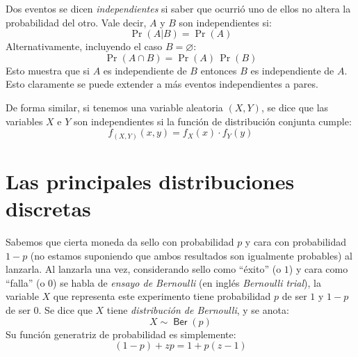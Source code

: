   Dos eventos se dicen \emph{independientes}%
  si saber que ocurrió uno de ellos
  no altera la probabilidad del otro.
  Vale decir,
  \(A\) y \(B\) son independientes si:
  \begin{equation*}
    \Pr(A \vert B)
      = \Pr(A)
  \end{equation*}
  Alternativamente,
  incluyendo el caso \(B = \varnothing\):
  \begin{equation}
    \label{eq:def-independencia}
    \Pr(A \cap B)
      = \Pr(A) \, \Pr(B)
  \end{equation}
  Esto muestra que si \(A\) es independiente de \(B\)
  entonces \(B\) es independiente de \(A\).
  Esto claramente se puede extender a más eventos
  independientes a pares.

  De forma similar,
  si tenemos una variable aleatoria \((X, Y)\),
  se dice que las variables \(X\) e \(Y\) son independientes%
  si la función de distribución conjunta cumple:
  \begin{equation}
    \label{eq:independent-variables}
    f_{(X, Y)}(x, y)
      = f_X(x) \cdot f_Y(y)
  \end{equation}

\section{Las principales distribuciones discretas}
\label{sec:principales-distribuciones-discretas}

  Sabemos que cierta moneda da sello con probabilidad \(p\)
  y cara con probabilidad \(1 - p\)
  (no estamos suponiendo
   que ambos resultados son igualmente probables)
  al lanzarla.
  Al lanzarla una vez,
  considerando sello como ``éxito''
  (o \(1\))
  y cara como ``falla''
  (o \(0\))
  se habla de \emph{ensayo de Bernoulli}%
  (en inglés \emph{\foreignlanguage{english}{Bernoulli trial}}),
  la variable \(X\) que representa este experimento
  tiene probabilidad \(p\) de ser \(1\) y \(1 - p\) de ser \(0\).
  Se dice que \(X\) tiene \emph{distribución de Bernoulli},%
  y se anota:
  \begin{equation}
    \label{eq:distributed-Ber}
    X \sim \operatorname{\boldsymbol{\mathsf{Ber}}}(p)
  \end{equation}
  Su función generatriz de probabilidad es simplemente:
  \begin{equation}
    \label{eq:PGF-Ber}
    (1 - p) + z p
      = 1 + p (z - 1)
  \end{equation}

